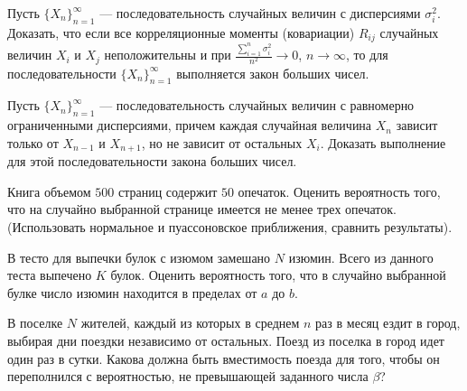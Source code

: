 \begin{problem}
Пусть $\{ X_n\}_{n=1}^{\infty}$ --- последовательность случайных величин с дисперсиями $\sigma_i^2$. Доказать, что если все 
корреляционные моменты (ковариации) $R_{ij}$ случайных величин $X_i$ и $X_j$ неположительны и при  
$\frac{\sum\limits_{i=1}^{n} \sigma_i^2}{n^2}\to 0$, $n\to\infty$, то для последовательности $\{ X_n\}_{n=1}^{\infty}$ выполняется закон больших чисел. 
\end{problem}

\begin{problem}
Пусть $\{ X_n\}_{n=1}^{\infty}$ --- последовательность случайных величин с равномерно ограниченными дисперсиями, причем каждая 
случайная величина $X_n$ зависит только от $X_{n-1}$ и $X_{n+1}$, но не зависит от остальных $X_i$. Доказать выполнение для этой 
последовательности закона больших чисел.
\end{problem}

\begin{problem}
Книга объемом $500$ страниц содержит $50$ опечаток. Оценить вероятность того, что на случайно выбранной странице 
имеется не менее трех опечаток. (Использовать нормальное и пуассоновское приближения, сравнить результаты). 
\end{problem}

\begin{problem}
В тесто для выпечки булок с изюмом замешано $N$ изюмин. Всего из данного теста выпечено $K$ булок. Оценить вероятность того, 
что в случайно выбранной булке число изюмин находится в пределах от $a$ до $b$. 
\end{problem}

\begin{problem}
В поселке $N$ жителей, каждый из которых в среднем $n$ раз в месяц ездит в город, выбирая дни поездки независимо от остальных. 
Поезд из поселка в город идет один раз в сутки. Какова должна быть вместимость поезда для того, чтобы он переполнился с вероятностью, 
не превышающей заданного числа $\beta$? 
\end{problem}
